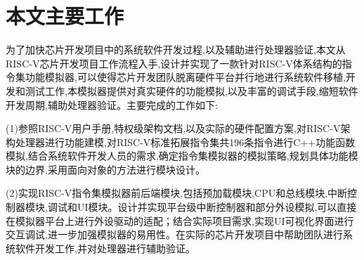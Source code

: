 


\section{本文主要工作}
为了加快芯片开发项目中的系统软件开发过程,以及辅助进行处理器验证,本文从RISC-V芯片开发项目工作流程入手,设计并实现了一款针对RISC-V体系结构的指令集功能模拟器,可以使得芯片开发团队脱离硬件平台并行地进行系统软件移植,开发和测试工作,本模拟器提供对真实硬件的功能模拟,以及丰富的调试手段,缩短软件开发周期,辅助处理器验证。主要完成的工作如下:


(1)参照RISC-V用户手册,特权级架构文档,以及实际的硬件配置方案,对RISC-V架构处理器进行功能建模,对RISC-V标准拓展指令集共196条指令进行C++功能函数模拟,结合系统软件开发人员的需求,确定指令集模拟器的模拟策略,规划具体功能模块的边界,采用面向对象的方法进行模块设计。


(2)实现RISC-V指令集模拟器前后端模块,包括预加载模块,CPU和总线模块,中断控制器模块,调试和UI模块。设计并实现平台级中断控制器和部分外设模拟,可以直接在模拟器平台上进行外设驱动的适配；结合实际项目需求,实现UI可视化界面进行交互调试,进一步加强模拟器的易用性。在实际的芯片开发项目中帮助团队进行系统软件开发工作,并对处理器进行辅助验证。


